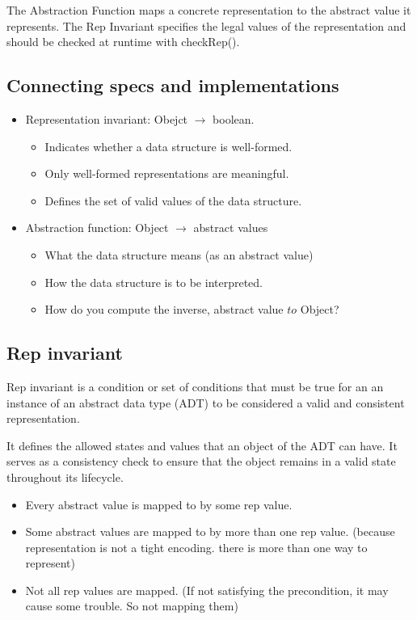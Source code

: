 \documentclass[letterpaper,12pt]{article}
\begin{document}
The Abstraction Function maps a concrete representation to the abstract value
it represents. The Rep Invariant specifies the legal values of the representation
and should be checked at runtime with checkRep().

\subsection{Connecting specs and implementations}
\begin{itemize}
      \item Representation invariant: Obejct $\to$ boolean.
            \begin{itemize}
                  \item Indicates whether a data structure is well-formed.
                  \item Only well-formed representations are meaningful.
                  \item Defines the set of valid values of the data structure.
            \end{itemize}
      \item Abstraction function: Object $\to$ abstract values
            \begin{itemize}
                  \item What the data structure means (as an abstract value)
                  \item How the data structure is to be interpreted.
                  \item How do you compute the inverse, abstract value $to$ Object?
            \end{itemize}
\end{itemize}

\subsection{Rep invariant}
Rep invariant is a condition or set of conditions that must be true for an
an instance of an abstract data type (ADT) to be considered a valid and consistent
representation.

It defines the allowed states and values that an object of the ADT can have. It
serves as a consistency check to ensure that the object remains in a valid
state throughout its lifecycle.

\begin{itemize}
      \item Every abstract value is mapped to by some rep value.
      \item Some abstract values are mapped to by more than one rep value. (because
            representation is not a tight encoding. there is more than one way to
            represent)
      \item Not all rep values are mapped. (If not satisfying the precondition, it may
            cause some trouble. So not mapping them)
\end{itemize}
\end{document}
